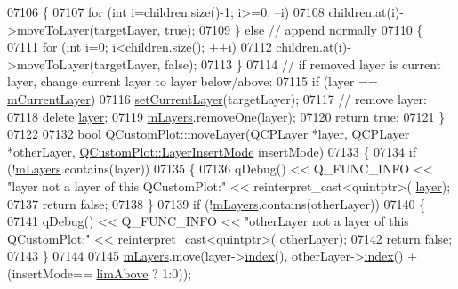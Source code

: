 \begin{DoxyCode}
07106   \{
07107     \textcolor{keywordflow}{for} (\textcolor{keywordtype}{int} i=children.size()-1; i>=0; --i)
07108       children.at(i)->moveToLayer(targetLayer, \textcolor{keyword}{true});
07109   \} \textcolor{keywordflow}{else}  \textcolor{comment}{// append normally}
07110   \{
07111     \textcolor{keywordflow}{for} (\textcolor{keywordtype}{int} i=0; i<children.size(); ++i)
07112       children.at(i)->moveToLayer(targetLayer, \textcolor{keyword}{false});
07113   \}
07114   \textcolor{comment}{// if removed layer is current layer, change current layer to layer below/above:}
07115   \textcolor{keywordflow}{if} (layer == \hyperlink{a00116_ae9821179b860bf04af25882e881e5e09}{mCurrentLayer})
07116     \hyperlink{a00116_a73a6dc47c653bb6f8f030abca5a11852}{setCurrentLayer}(targetLayer);
07117   \textcolor{comment}{// remove layer:}
07118   \textcolor{keyword}{delete} \hyperlink{a00116_ae576ada60c1133318e29348d43d3cf10}{layer};
07119   \hyperlink{a00116_ae46b0ffefe1087007ffb11398a18a20e}{mLayers}.removeOne(layer);
07120   \textcolor{keywordflow}{return} \textcolor{keyword}{true};
07121 \}
07122 
07132 \textcolor{keywordtype}{bool} \hyperlink{a00116_ad18d1ff9086f2e658b81d67d3c84a0c3}{QCustomPlot::moveLayer}(\hyperlink{a00043}{QCPLayer} *\hyperlink{a00116_ae576ada60c1133318e29348d43d3cf10}{layer}, 
      \hyperlink{a00043}{QCPLayer} *otherLayer, \hyperlink{a00116_acf68ae22e9b44e959fc82bc6366e9b8d}{QCustomPlot::LayerInsertMode} insertMode)
07133 \{
07134   \textcolor{keywordflow}{if} (!\hyperlink{a00116_ae46b0ffefe1087007ffb11398a18a20e}{mLayers}.contains(layer))
07135   \{
07136     qDebug() << Q\_FUNC\_INFO << \textcolor{stringliteral}{"layer not a layer of this QCustomPlot:"} << \textcolor{keyword}{reinterpret\_cast<}quintptr\textcolor{keyword}{>}(
      \hyperlink{a00116_ae576ada60c1133318e29348d43d3cf10}{layer});
07137     \textcolor{keywordflow}{return} \textcolor{keyword}{false};
07138   \}
07139   \textcolor{keywordflow}{if} (!\hyperlink{a00116_ae46b0ffefe1087007ffb11398a18a20e}{mLayers}.contains(otherLayer))
07140   \{
07141     qDebug() << Q\_FUNC\_INFO << \textcolor{stringliteral}{"otherLayer not a layer of this QCustomPlot:"} << \textcolor{keyword}{reinterpret\_cast<}quintptr\textcolor{keyword}{>}(
      otherLayer);
07142     \textcolor{keywordflow}{return} \textcolor{keyword}{false};
07143   \}
07144   
07145   \hyperlink{a00116_ae46b0ffefe1087007ffb11398a18a20e}{mLayers}.move(layer->\hyperlink{a00043_ad5d7010829a6b99f326b07d7e37c8c99}{index}(), otherLayer->\hyperlink{a00043_ad5d7010829a6b99f326b07d7e37c8c99}{index}() + (insertMode==
      \hyperlink{a00116_acf68ae22e9b44e959fc82bc6366e9b8da065748f172d5a34ffd1e09924d55cc17}{limAbove} ? 1:0));

\end{DoxyCode}
